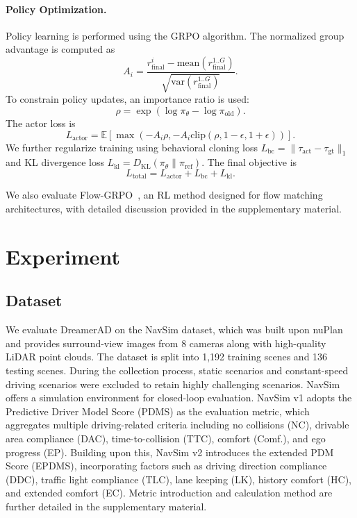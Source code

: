 \documentclass[runningheads]{llncs}
\begin{document}
\paragraph{\textbf{Policy Optimization.}}
Policy learning is performed using the GRPO algorithm. The normalized group advantage is computed as
\begin{equation}
A_i=\frac{r^i_{\text{final}}-\text{mean}(r_{\text{final}}^{1..G})}{\sqrt{\text{var}(r_{\text{final}}^{1..G})}}.
\end{equation}
To constrain policy updates, an importance ratio is used:
\begin{equation}
\rho=\exp(\log \pi_\theta-\log \pi_{\text{old}}).
\end{equation}
The actor loss is
\begin{equation}
L_{\text{actor}}=\mathbb{E}\left[\max(-A_i\rho,-A_i\text{clip}(\rho,1-\epsilon,1+\epsilon))\right].
\end{equation}
We further regularize training using behavioral cloning loss $L_{\text{bc}}=\|\tau_{\text{act}}-\tau_{\text{gt}}\|_1$ and KL divergence loss $L_{\text{kl}}=D_{\text{KL}}(\pi_\theta\|\pi_{\text{ref}})$. The final objective is
\begin{equation}
L_{\text{total}}=L_{\text{actor}}+L_{\text{bc}}+L_{\text{kl}}.
\end{equation}

We also evaluate Flow-GRPO~\cite{liu2025flow}, an RL method designed for flow matching architectures, with detailed discussion provided in the supplementary material.

\section{Experiment}

\subsection{Dataset}
We evaluate DreamerAD on the NavSim dataset, which was built upon nuPlan and provides surround-view images from 8 cameras along with high-quality LiDAR point clouds. 
The dataset is split into 1,192 training scenes and 136 testing scenes. During the collection process, static scenarios and constant-speed driving scenarios were excluded to retain highly challenging scenarios. NavSim offers a simulation environment for closed-loop evaluation. NavSim v1 adopts the Predictive Driver Model Score (PDMS) as the evaluation metric, which aggregates multiple driving-related criteria including no collisions (NC), drivable area compliance (DAC), time-to-collision (TTC), comfort (Comf.), and ego progress (EP). 
Building upon this, NavSim v2 introduces the extended PDM Score (EPDMS), incorporating factors such as driving direction compliance (DDC), traffic light compliance (TLC), lane keeping (LK), history comfort (HC), and extended comfort (EC). Metric introduction and calculation method are further detailed in the supplementary material.
\end{document}
